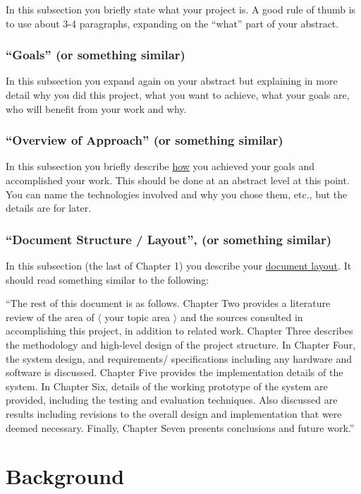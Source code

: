 \documentclass{report}[a4paper,12pt,onecolumn]
\begin{document}
In this subsection you briefly state what your project is. A good rule of thumb is to use about 3-4 paragraphs, expanding on the ``what'' part of your abstract.

\subsection{``Goals'' (or something similar)}

In this subsection you expand again on your abstract but explaining in more detail why you did this project, what you want to achieve, what your goals are, who will benefit from your work and why.

\subsection{``Overview of Approach'' (or something similar)}

In this subsection you briefly describe \underline{how} you achieved your goals and accomplished your work. This should be done at an abstract level at this point. You can name the technologies involved and why you chose them, etc., but the details are for later.

\subsection{``Document Structure / Layout'', (or something 
similar)}

In this subsection (the last of Chapter 1) you describe your \underline{document layout}. It should read something similar to the following:

``The rest of this document is as follows. Chapter Two provides a literature review of the area of $\langle$ your topic area $\rangle$ and the sources consulted in accomplishing this project, in addition to related work. Chapter Three describes the methodology and high-level design of the project structure. In Chapter Four, the system design, and requirements/ specifications including any hardware and software is discussed. Chapter Five provides the implementation details of the system. In Chapter Six, details of the working prototype of the system are provided, including the testing and evaluation techniques. Also discussed are results including revisions to the overall design and implementation that were deemed necessary. Finally, Chapter Seven presents conclusions and future work.''

\chapter{Background}
\end{document}
